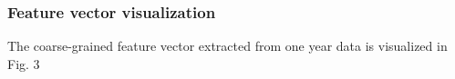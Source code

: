 \documentclass[a4paper, 10pt, conference]{ieeeconf}      %
\begin{document}
\subsubsection{Feature vector visualization}The coarse-grained feature vector extracted from one year data is visualized in Fig. 3

\begin{figure}[htbp]
    \centering


\end{figure}
\end{document}
